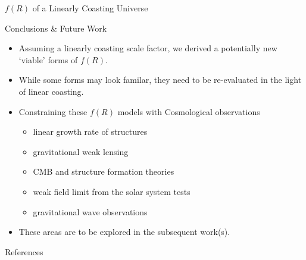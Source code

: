 \documentclass[final,hyperref={pdfpagelabels=false}]{beamer}
\begin{document}
\begin{frame}[t]
\begin{columns}[t]
\begin{column}{.465\textwidth}
\begin{block}{$f(R)$ of a Linearly Coasting Universe}
\end{block}
%

\begin{block}{Conclusions \& Future Work}

\begin{itemize}
\item Assuming a linearly coasting scale factor, we derived a potentially new `viable' forms of $f(R)$.
\item While some forms may look familar, they need to be re-evaluated in the light of linear coasting.
\item Constraining these $f(R)$ models with Cosmological observations 
\begin{itemize}
	\item linear growth rate of structures
	\item gravitational weak lensing 
	\item CMB and structure formation theories
	\item weak field limit from the solar system tests
	\item gravitational wave observations
\end{itemize}

\item These areas are to be explored in the subsequent work(s).
\end{itemize}

\end{block}


\begin{block}{References}
        
\nocite{*} %
\small{
}

\end{block}

%
%
%


\end{column}
\end{columns}
\end{frame}
\end{document}
